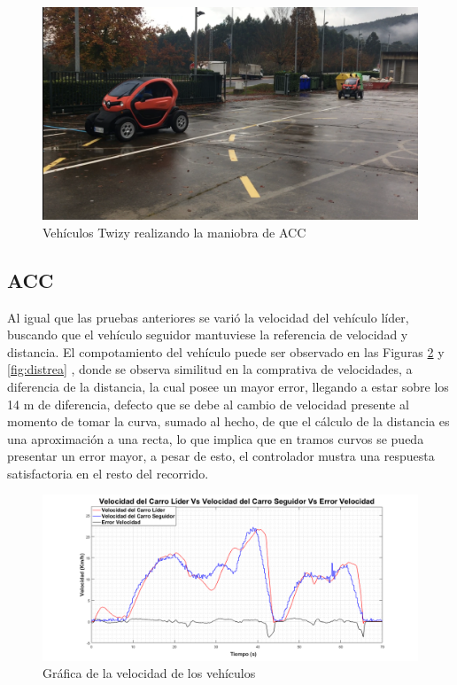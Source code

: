 \begin{figure}[H]
	\centering
		\includegraphics[scale=0.45]{Imagenes/accreal}
		\caption{Vehículos Twizy realizando la maniobra de ACC}
		\label{fig:accreal}
\end{figure}	

\subsection{ACC}
Al igual que las pruebas anteriores se varió la velocidad del vehículo líder, buscando que el vehículo seguidor mantuviese la referencia de velocidad y distancia. El compotamiento del vehículo puede ser observado en las Figuras \ref{fig:velrea} y \ref{fig:distrea} , donde se observa similitud en la comprativa de velocidades, a diferencia de la distancia, la cual posee un mayor error, llegando a estar sobre los 14 m de diferencia, defecto que se debe al cambio de velocidad presente al momento de tomar la curva, sumado al hecho, de que el cálculo de la distancia es una aproximación a una recta, lo que implica que en tramos curvos se pueda presentar un error mayor, a pesar de esto, el controlador mustra una respuesta satisfactoria en el resto del recorrido. \\  
\begin{figure}[H]
	\centering
		\includegraphics[scale=0.35]{Imagenes/velrea}
		\caption{Gráfica de la velocidad de los vehículos}
		\label{fig:velrea}
\end{figure}	

